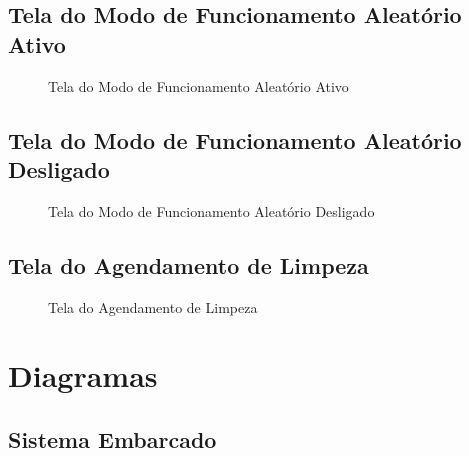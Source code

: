 \subsection{Tela do Modo de Funcionamento Aleatório Ativo}
\begin{figure}[H]
\centering
{}
\caption{Tela do Modo de Funcionamento Aleatório Ativo}
\end{figure}

\subsection{Tela do Modo de Funcionamento Aleatório Desligado}
\begin{figure}[H]
\centering
{}
\caption{Tela do Modo de Funcionamento Aleatório Desligado}
\end{figure}

\subsection{Tela do Agendamento de Limpeza}
\begin{figure}[H]
\centering
{}
\caption{Tela do Agendamento de Limpeza}
\end{figure}

\section{Diagramas}
\label{diagramaFirmware}
\subsection{Sistema Embarcado}
